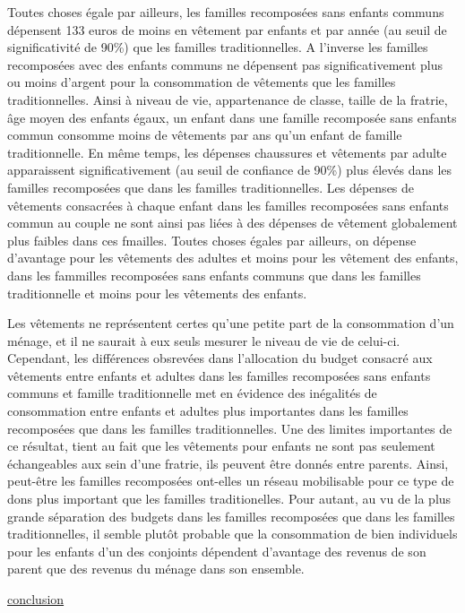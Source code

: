 \documentclass[
  12pt,
]{book}
\begin{document}
Toutes choses égale par ailleurs, les familles recomposées sans enfants
communs dépensent 133 euros de moins en vêtement par enfants et par
année (au seuil de significativité de 90\%) que les familles
traditionnelles. A l'inverse les familles recomposées avec des enfants
communs ne dépensent pas significativement plus ou moins d'argent pour
la consommation de vêtements que les familles traditionnelles. Ainsi à
niveau de vie, appartenance de classe, taille de la fratrie, âge moyen
des enfants égaux, un enfant dans une famille recomposée sans enfants
commun consomme moins de vêtements par ans qu'un enfant de famille
traditionnelle. En même temps, les dépenses chaussures et vêtements par
adulte apparaissent significativement (au seuil de confiance de 90\%)
plus élevés dans les familles recomposées que dans les familles
traditionnelles. Les dépenses de vêtements consacrées à chaque enfant
dans les familles recomposées sans enfants commun au couple ne sont
ainsi pas liées à des dépenses de vêtement globalement plus faibles dans
ces fmailles. Toutes choses égales par ailleurs, on dépense d'avantage
pour les vêtements des adultes et moins pour les vêtement des enfants,
dans les fammilles recomposées sans enfants communs que dans les
familles traditionnelle et moins pour les vêtements des enfants.

Les vêtements ne représentent certes qu'une petite part de la
consommation d'un ménage, et il ne saurait à eux seuls mesurer le niveau
de vie de celui-ci. Cependant, les différences obsrevées dans
l'allocation du budget consacré aux vêtements entre enfants et adultes
dans les familles recomposées sans enfants communs et famille
traditionnelle met en évidence des inégalités de consommation entre
enfants et adultes plus importantes dans les familles recomposées que
dans les familles traditionnelles. Une des limites importantes de ce
résultat, tient au fait que les vêtements pour enfants ne sont pas
seulement échangeables aux sein d'une fratrie, ils peuvent être donnés
entre parents. Ainsi, peut-être les familles recomposées ont-elles un
réseau mobilisable pour ce type de dons plus important que les familles
traditionelles. Pour autant, au vu de la plus grande séparation des
budgets dans les familles recomposées que dans les familles
traditionnelles, il semble plutôt probable que la consommation de bien
individuels pour les enfants d'un des conjoints dépendent d'avantage des
revenus de son parent que des revenus du ménage dans son ensemble.

\hyperref[conclusion]{conclusion}
\end{document}
